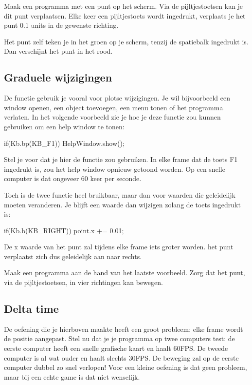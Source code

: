 \begin{exercise}
Maak een programma met een punt op het scherm. Via de pijltjestoetsen kan je dit punt verplaatsen. Elke keer een pijltjestoets wordt ingedrukt, verplaats je het punt 0.1 units in de gewenste richting.

Het punt zelf teken je in het groen op je scherm, tenzij de spatiebalk ingedrukt is. Dan verschijnt het punt in het rood.
\end{exercise}

\subsection{Graduele wijzigingen}
\label{chapter:keyboardInteractie}
De functie  gebruik je vooral voor plotse wijzigingen. Je wil bijvoorbeeld een window openen, een object toevoegen, een menu tonen of het programma verlaten. In het volgende voorbeeld zie je hoe je deze functie zou kunnen gebruiken om een help window te tonen:

\begin{code}
if(Kb.bp(KB_F1)) HelpWindow.show();
\end{code}

Stel je voor dat je hier de functie  zou gebruiken. In elke frame dat de toets F1 ingedrukt is, zou het help window opnieuw getoond worden. Op een snelle computer is dat ongeveer 60 keer per seconde. 

Toch is de twee functie heel bruikbaar, maar dan voor waarden die geleidelijk moeten veranderen. Je blijft een waarde dan wijzigen zolang de toets ingedrukt is:

\begin{code}
if(Kb.b(KB_RIGHT)) point.x += 0.01;
\end{code}

De x waarde van het punt zal tijdens elke frame iets groter worden. het punt verplaatst zich dus geleidelijk aan naar rechts.

\begin{exercise}
Maak een programma aan de hand van het laatste voorbeeld. Zorg dat het punt, via de pijltjestoetsen, in vier richtingen kan bewegen.
\end{exercise}

\subsection{Delta time}
De oefening die je hierboven maakte heeft een groot probleem: elke frame wordt de positie aangepast. Stel nu dat je je programma op twee computers test: de eerste computer heeft een snelle grafische kaart en haalt 60FPS. De tweede computer is al wat ouder en haalt slechts 30FPS. De beweging zal op de eerste computer dubbel zo snel verlopen! Voor een kleine oefening is dat geen probleem, maar bij een echte game is dat niet wenselijk.

